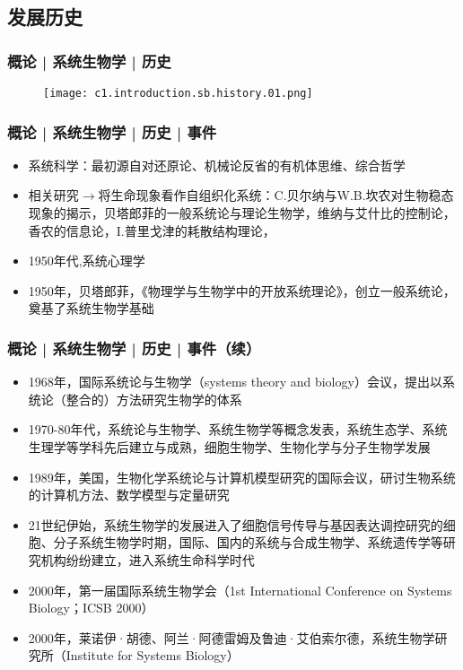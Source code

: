 \subsection{发展历史}
\begin{frame}
  \frametitle{概论 | 系统生物学 | 历史}
  \begin{figure}
    \centering
    \texttt{[image: c1.introduction.sb.history.01.png]}
  \end{figure}
\end{frame}

\begin{frame}
  \frametitle{概论 | 系统生物学 | 历史 | 事件}
  \begin{itemize}
    \item 系统科学：最初源自对还原论、机械论反省的有机体思维、综合哲学
    \item 相关研究$\rightarrow$将生命现象看作自组织化系统：C.贝尔纳与W.B.坎农对生物稳态现象的揭示，贝塔郎菲的一般系统论与理论生物学，维纳与艾什比的控制论，香农的信息论，I.普里戈津的耗散结构理论，
    \item 1950年代,系统心理学
    \item 1950年，贝塔郎菲，《物理学与生物学中的开放系统理论》，创立一般系统论，奠基了系统生物学基础
  \end{itemize}
\end{frame}

\begin{frame}
  \frametitle{概论 | 系统生物学 | 历史 | 事件（续）}
  \begin{itemize}
    \item 1968年，国际系统论与生物学（systems theory and biology）会议，提出以系统论（整合的）方法研究生物学的体系
    \item 1970-80年代，系统论与生物学、系统生物学等概念发表，系统生态学、系统生理学等学科先后建立与成熟，细胞生物学、生物化学与分子生物学发展
    \item 1989年，美国，生物化学系统论与计算机模型研究的国际会议，研讨生物系统的计算机方法、数学模型与定量研究
    \item 21世纪伊始，系统生物学的发展进入了细胞信号传导与基因表达调控研究的细胞、分子系统生物学时期，国际、国内的系统与合成生物学、系统遗传学等研究机构纷纷建立，进入系统生命科学时代
    \item 2000年，第一届国际系统生物学会（1st International Conference on Systems Biology；ICSB 2000）
    \item 2000年，莱诺伊·胡德、阿兰·阿德雷姆及鲁迪·艾伯索尔德，系统生物学研究所（Institute for Systems Biology）
  \end{itemize}
\end{frame}

